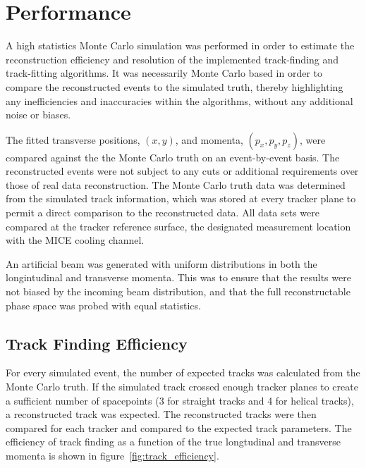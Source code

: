 \section{Performance}
\label{sec:Performance}

  A high statistics Monte Carlo simulation was performed in order to estimate the reconstruction efficiency and resolution of the implemented track-finding and track-fitting algorithms. It was necessarily Monte Carlo based in order to compare the reconstructed events to the simulated truth, thereby highlighting any inefficiencies and inaccuracies within the algorithms, without any additional noise or biases.

  The fitted transverse positions, $(x,y)$, and momenta, $(p_x, p_y, p_z)$, were compared against the the Monte Carlo truth on an event-by-event basis. The reconstructed events were not subject to any cuts or additional requirements over those of real data reconstruction. The Monte Carlo truth data was determined from the simulated track information, which was stored at every tracker plane to permit a direct comparison to the reconstructed data. All data sets were compared at the tracker reference surface, the designated measurement location with the MICE cooling channel.

  An artificial beam was generated with uniform distributions in both the longintudinal and transverse momenta. This was to ensure that the results were not biased by the incoming beam distribution, and that the full reconstructable phase space was probed with equal statistics.

  \subsection{Track Finding Efficiency}
  \label{sec:performance:track_finding}

  For every simulated event, the number of expected tracks was calculated from the Monte Carlo truth. If the simulated track crossed enough tracker planes to create a sufficient number of spacepoints (3 for straight tracks and 4 for helical tracks), a reconstructed track was expected. The reconstructed tracks were then compared for each tracker and compared to the expected track parameters. The efficiency of track finding as a function of the true longtudinal and transverse momenta is shown in figure~\ref{fig:track_efficiency}.

